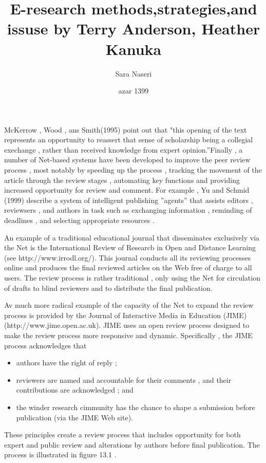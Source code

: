 \documentclass{article}
\title{E-research methods,strategies,and issuse by Terry Anderson, Heather Kanuka}
\author{Sara Naseri }
\date {azar 1399}
\begin{document}
\maketitle

McKerrow , Wood , ans Smith(1995) point out that "this opening of the text represents an opportunity to reassert that sense of scholarship being a collegial exechange , rather than received knowledge from expert opinion.''Finally , a number of Net-based systems have been developed to improve the peer review process , most notably by speeding up the process , tracking the movement of the article through the review stages , automating key functions and providing increased opportunity for review and comment. For example , Yu and Schmid (1999)  describe a system of intelligent publishing ''agents'' that assists editors , reviewsers , and authors in task such as exchanging information , reminding of deadlines , and selecting appropriate resources .

An example of a traditional educational journal that disseminates exclusively via the Net is the International Review of Researcb in Open and Distance Learning (see http://www.irrodl.org/). This journal conducts all its reviewing processes online and produces the final reviewed articles on the Web free of charge to all users. The review process is rather traditional , only using the Net for circulation of drafts to blind reviewers and to distribute the final publication.

Av much more radical example of the capacity of the Net to expand the review process is provided by the Journal of Interactive Media in Education (JIME) (http://www.jime.open.ac.uk). JIME uses an open review process designed to make the review process more responsive and dynamic. Specifically , the JIME process acknowledges that

\begin{itemize}
\item authors have the right of reply ;
\item reviewers are named and accountable for their comments , and their contributions are acknowledged ; and
\item the winder research cimmunity has the chance to shape a submission before publication (via the JIME Web site).
\end{itemize}
 
These principles create a review process that includes opportunity for both expert and public review and alterations by authors before final publication. The process is illustrated in figure 13.1 .
\end{document}
